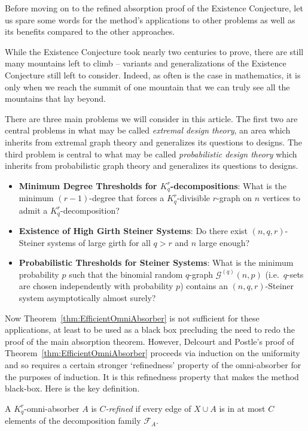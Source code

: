 \documentclass[twoside,leqno]{article}
\begin{document}
Before moving on to the refined absorption proof of the Existence Conjecture, let us spare some words for the method's applications to other problems as well as its benefits compared to the other approaches. 

While the Existence Conjecture took nearly two centuries to prove, there are still many mountains left to climb -- variants and generalizations of the Existence Conjecture still left to consider. Indeed, as often is the case in mathematics, it is only when we reach the summit of one mountain that we can truly see all the mountains that lay beyond.  

There are three main problems we will consider in this article. The first two are central problems in what may be called \emph{extremal design theory}, an area which inherits from extremal graph theory and generalizes its questions to designs. The third problem is central to what may be called \emph{probabilistic design theory} which inherits from probabilistic graph theory and generalizes its questions to designs. 

\begin{itemize}
    \item \textbf{Minimum Degree Thresholds for $K_q^r$-decompositions}: What is the minimum $(r-1)$-degree that forces a $K_q^r$-divisible $r$-graph on $n$ vertices to admit a $K_q^r$-decomposition?
    \item \textbf{Existence of High Girth Steiner Systems}: Do there exist $(n,q,r)$-Steiner systems of large girth for all $q > r$ and $n$ large enough?
    \item \textbf{Probabilistic Thresholds for Steiner Systems}: What is the minimum probability $p$ such that the binomial random $q$-graph $\mathcal{G}^{(q)}(n,p)$ (i.e.~$q$-sets are chosen independently with probability $p$) contains an $(n,q,r)$-Steiner system asymptotically almost surely?
\end{itemize}

Now Theorem~\ref{thm:EfficientOmniAbsorber} is not sufficient for these applications, at least to be used as a black box precluding the need to redo the proof of the main absorption theorem. However, Delcourt and Postle's proof of Theorem~\ref{thm:EfficientOmniAbsorber} proceeds via induction on the uniformity and so requires a certain stronger `refinedness' property of the omni-absorber for the purposes of induction. It is this refinedness property that makes the method black-box. Here is the key definition.


\begin{definition}[$C$-refined]
A $K_q^r$-omni-absorber $A$ is \emph{$C$-refined} if every edge of $X\cup A$ is in at most $C$ elements of the decomposition family $\mathcal{F}_A$.    
\end{definition} 
\end{document}

